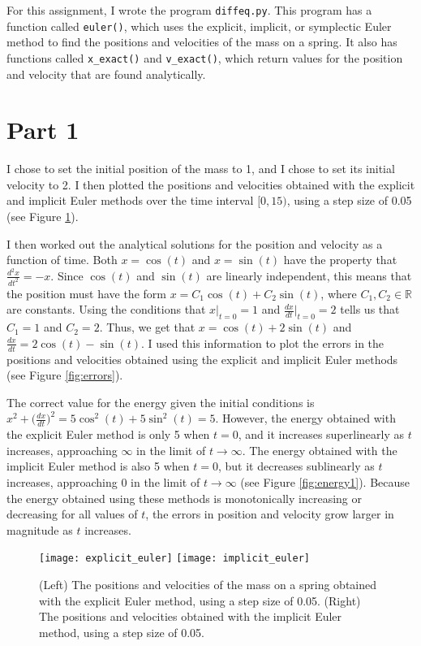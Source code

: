 \documentclass[11pt]{article}
\begin{document}
For this assignment, I wrote the program \verb|diffeq.py|. This program has a function called \verb|euler()|, which uses the explicit, implicit, or symplectic Euler method to find the positions and velocities of the mass on a spring. It also has functions called \verb|x_exact()| and \verb|v_exact()|, which return values for the position and velocity that are found analytically.

\section*{Part 1}
I chose to set the initial position of the mass to 1, and I chose to set its initial velocity to 2. I then plotted the positions and velocities obtained with the explicit and implicit Euler methods over the time interval $[0, 15)$, using a step size of 0.05 (see Figure \ref{fig:positionsAndVelocities1}).

I then worked out the analytical solutions for the position and velocity as a function of time. Both $x = \cos(t)$ and $x = \sin(t)$ have the property that $\frac{d^2x}{dt^2} = -x$. Since $\cos(t)$ and $\sin(t)$ are linearly independent, this means that the position must have the form $x = C_1\cos(t) + C_2\sin(t)$, where $C_1, C_2 \in \mathbb{R}$ are constants. Using the conditions that $x\bigr|_{t = 0} = 1$ and $\frac{dx}{dt}\bigr|_{t = 0} = 2$ tells us that $C_1 = 1$ and $C_2 = 2$. Thus, we get that $x = \cos(t) + 2\sin(t)$ and $\frac{dx}{dt} = 2\cos(t) - \sin(t)$. I used this information to plot the errors in the positions and velocities obtained using the explicit and implicit Euler methods (see Figure \ref{fig:errors}).

The correct value for the energy given the initial conditions is $x^2 + \bigl(\frac{dx}{dt}\bigr)^2 = 5\cos^2(t) + 5\sin^2(t) = 5$. However, the energy obtained with the explicit Euler method is only 5 when $t = 0$, and it increases superlinearly as $t$ increases, approaching $\infty$ in the limit of $t \to \infty$. The energy obtained with the implicit Euler method is also 5 when $t = 0$, but it decreases sublinearly as $t$ increases, approaching 0 in the limit of $t \to \infty$ (see Figure \ref{fig:energy1}). Because the energy obtained using these methods is monotonically increasing or decreasing for all values of $t$, the errors in position and velocity grow larger in magnitude as $t$ increases.

\vfill

\begin{figure}[H]
    \texttt{[image: explicit\_euler]} \hspace{0.7em} \texttt{[image: implicit\_euler]}\\
    \caption{(Left) The positions and velocities of the mass on a spring obtained with the explicit Euler method, using a step size of 0.05. (Right) The positions and velocities obtained with the implicit Euler method, using a step size of 0.05.}
    \label{fig:positionsAndVelocities1}
\end{figure}
\end{document}
